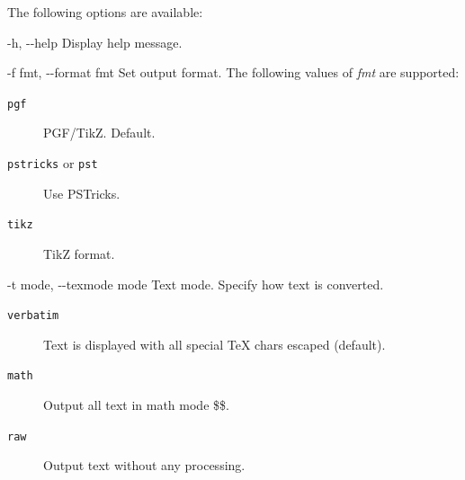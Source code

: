 \documentclass[10pt,a4paper,english]{article}
\newcommand{\optionlistlabel}[1]{\bf #1 \hfill}
\newenvironment{optionlist}[1]
{\begin{list}{}
  {\setlength{\labelwidth}{#1}
   \setlength{\rightmargin}{1cm}
   \setlength{\leftmargin}{\rightmargin}
   \addtolength{\leftmargin}{\labelwidth}
   \addtolength{\leftmargin}{\labelsep}
   \renewcommand{\makelabel}{\optionlistlabel}}
}{\end{list}}
\newcommand{\titlereference}[1]{\textsl{#1}}
\begin{document}
The following options are available:
\begin{optionlist}{3cm}
\item [-h, -{}-help]  
Display help message.
\item [-f fmt, -{}-format fmt]  
Set output format. The following values of \titlereference{fmt} are supported:
\begin{description}
\item[{\texttt{pgf}}] \leavevmode 
PGF/TikZ. Default.

\item[{\texttt{pstricks} or \texttt{pst}}] \leavevmode 
Use PSTricks.

\item[{\texttt{tikz}}] \leavevmode 
TikZ format.

\end{description}
\item [-t mode, -{}-texmode mode]  
Text mode. Specify how text is converted.
\begin{description}
\item[{\texttt{verbatim}}] \leavevmode 
Text is displayed with all special TeX chars escaped (default).

\item[{\texttt{math}}] \leavevmode 
Output all text in math mode {\$}{\$}.

\item[{\texttt{raw}}] \leavevmode 
Output text without any processing.

\end{description}


\end{optionlist}
\end{document}
